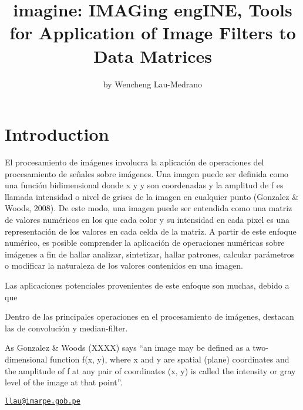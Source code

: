 \title{imagine: IMAGing engINE, Tools for Application of Image Filters to Data
Matrices}
\author{by Wencheng Lau-Medrano}

\maketitle


\section{Introduction}\label{introduction}

El procesamiento de imágenes involucra la aplicación de operaciones del
procesamiento de señales sobre imágenes. Una imagen puede ser definida
como una función bidimensional donde x y y son coordenadas y la amplitud
de f es llamada intensidad o nivel de grises de la imagen en cualquier
punto (Gonzalez \& Woods, 2008). De este modo, una imagen puede ser
entendida como una matriz de valores numéricos en los que cada color y
su intensidad en cada pixel es una representación de los valores en cada
celda de la matriz. A partir de este enfoque numérico, es posible
comprender la aplicación de operaciones numéricas sobre imágenes a fin
de hallar analizar, sintetizar, hallar patrones, calcular parámetros o
modificar la naturaleza de los valores contenidos en una imagen.

Las aplicaciones potenciales provenientes de este enfoque son muchas,
debido a que

Dentro de las principales operaciones en el procesamiento de imágenes,
destacan las de convolución y median-filter.

As Gonzalez \& Woods (XXXX) says ``an image may be defined as a
two-dimensional function f(x, y), where x and y are spatial (plane)
coordinates and the amplitude of f at any pair of coordinates (x, y) is
called the intensity or gray level of the image at that point''.

\address{%
Wencheng Lau-Medrano\\
Instituto del Mar del Perú\\
Esquina Gamarra y General Valle s/n, Chucuito, Callao-Perú\\ +51 (1)208-8650\\
}
\href{mailto:llau@imarpe.gob.pe}{\nolinkurl{llau@imarpe.gob.pe}}

